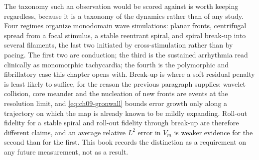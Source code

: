 The taxonomy such an observation would be scored against is worth keeping
regardless, because it is a taxonomy of the dynamics rather than of any study.
Four regimes organize monodomain wave simulations: planar fronts, centrifugal
spread from a focal stimulus, a stable reentrant spiral, and spiral break-up into
several filaments, the last two initiated by cross-stimulation rather than by
pacing. The first two are conduction; the third is the sustained arrhythmia read
clinically as monomorphic tachycardia; the fourth is the polymorphic and
fibrillatory case this chapter opens with. Break-up is where a soft residual
penalty is least likely to suffice, for the reason the previous paragraph
supplies: wavelet collision, core meander and the nucleation of new fronts are
events at the resolution limit, and \eqref{eq:ch09-gronwall} bounds error growth
only along a trajectory on which the map is already known to be mildly expanding.
Roll-out fidelity for a stable spiral and roll-out fidelity through break-up are
therefore different claims, and an average relative $L^2$ error in $V_m$ is weaker
evidence for the second than for the first. This book records the distinction as
a requirement on any future measurement, not as a result.

